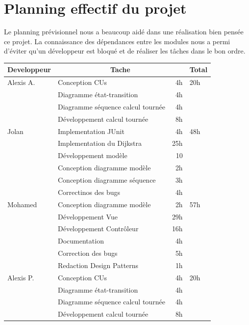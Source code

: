 \documentclass[10pt,a4paper]{book}
\begin{document}
\section{Planning effectif du projet}
Le planning prévisionnel nous a beaucoup aidé dans une réalisation bien pensée ce projet. La connaissance des dépendances entre les modules nous a permi d'éviter qu'un développeur est bloqué et de réaliser les tâches dans le bon ordre.\\
\begin{longtable}{|l|l|r|l|}
\hline
\textbf{Developpeur}&\multicolumn{2}{c|}{\textbf{Tache}}&\textbf{Total}\\
\hline

\hline
Alexis A. & Conception CUs & 4h & 20h\\
\cline{2-3}
& Diagramme état-transition & 4h & ~\\
\cline{2-3}
& Diagramme séquence calcul tournée & 4h & ~\\
\cline{2-3}
& Développement calcul tournée & 8h & ~\\
\hline

\hline
Jolan & Implementation JUnit & 4h & 48h\\
\cline{2-3}
& Implementation du Dijkstra & 25h & ~\\
\cline{2-3}
& Développement modèle & 10 & ~\\
\cline{2-3}
& Conception diagramme modèle & 2h & ~\\
\cline{2-3}
& Conception diagramme séquence & 3h & ~\\
\cline{2-3}
& Correctinos des bugs & 4h & ~\\
\hline

\hline
Mohamed & Conception diagramme modèle & 2h & 57h\\
\cline{2-3}
& Développement Vue & 29h & ~\\
\cline{2-3}
& Développement Contrôleur & 16h & ~\\
\cline{2-3}
& Documentation & 4h & ~\\
\cline{2-3}
& Correction des bugs & 5h & ~\\
\cline{2-3}
& Redaction Design Patterns & 1h & ~\\
\hline

\hline
Alexis P. & Conception CUs & 4h & 20h\\
\cline{2-3}
& Diagramme état-transition & 4h & ~\\
\cline{2-3}
& Diagramme séquence calcul tournée & 4h & ~\\
\cline{2-3}
& Développement calcul tournée & 8h & ~\\
\hline


\end{longtable}
\end{document}
